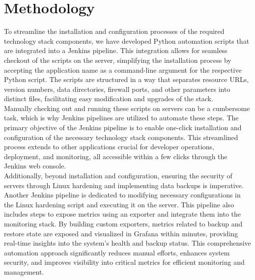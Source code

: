 \documentclass[12pt,a4paper,oneside]{report}
\begin{document}
\newpage
\chapter{Methodology}
To streamline the installation and configuration processes of the required technology stack components, we have developed Python automation scripts that are integrated into a Jenkins pipeline. This integration allows for seamless checkout of the scripts on the server, simplifying the installation process by accepting the application name as a command-line argument for the respective Python script. The scripts are structured in a way that separates resource URLs, version numbers, data directories, firewall ports, and other parameters into distinct files, facilitating easy modification and upgrades of the stack.\\ 

Manually checking out and running these scripts on servers can be a cumbersome task, which is why Jenkins pipelines are utilized to automate these steps. The primary objective of the Jenkins pipeline is to enable one-click installation and configuration of the necessary technology stack components. This streamlined process extends to other applications crucial for developer operations, deployment, and monitoring, all accessible within a few clicks through the Jenkins web console. \\

Additionally, beyond installation and configuration, ensuring the security of servers through Linux hardening and implementing data backups is imperative. Another Jenkins pipeline is dedicated to modifying necessary configurations in the Linux hardening script and executing it on the server. This pipeline also includes steps to expose metrics using an exporter and integrate them into the monitoring stack. By building custom exporters, metrics related to backup and restore state are exposed and visualized in Grafana within minutes, providing real-time insights into the system's health and backup status. This comprehensive automation approach significantly reduces manual efforts, enhances system security, and improves visibility into critical metrics for efficient monitoring and management.
\end{document}
